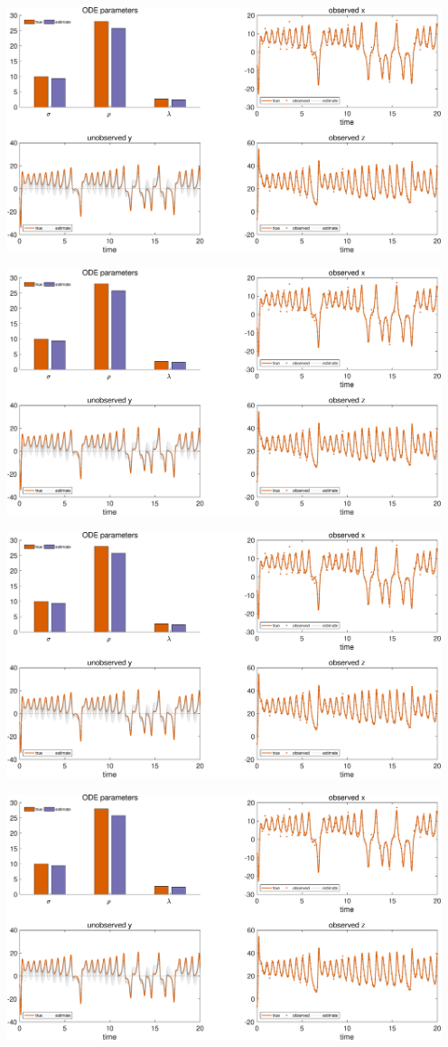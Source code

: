 {\includegraphics [width=5in]{VGM_for_Lorenz_Attractor_14.eps}

\includegraphics [width=5in]{VGM_for_Lorenz_Attractor_15.eps}

\includegraphics [width=5in]{VGM_for_Lorenz_Attractor_16.eps}

\includegraphics [width=5in]{VGM_for_Lorenz_Attractor_17.eps}

}
